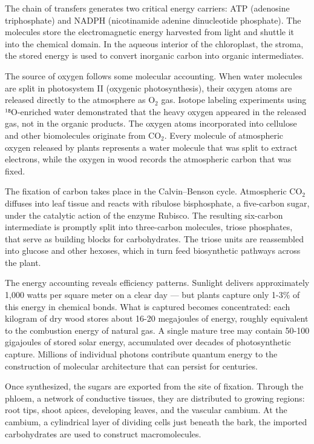 The chain of transfers generates two critical energy carriers: ATP (adenosine triphosphate) and NADPH (nicotinamide adenine dinucleotide phosphate). The molecules store the electromagnetic energy harvested from light and shuttle it into the chemical domain. In the aqueous interior of the chloroplast, the stroma, the stored energy is used to convert inorganic carbon into organic intermediates.

The source of oxygen follows some molecular accounting. When water molecules are split in photosystem II (oxygenic photosynthesis), their oxygen atoms are released directly to the atmosphere as \(\mathrm{O}_2\) gas. Isotope labeling experiments using ¹⁸O-enriched water demonstrated that the heavy oxygen appeared in the released gas, not in the organic products. The oxygen atoms incorporated into cellulose and other biomolecules originate from \(\mathrm{CO}_2\). Every molecule of atmospheric oxygen released by plants represents a water molecule that was split to extract electrons, while the oxygen in wood records the atmospheric carbon that was fixed.

The fixation of carbon takes place in the Calvin–Benson cycle. Atmospheric \(\mathrm{CO}_2\) diffuses into leaf tissue and reacts with ribulose bisphosphate, a five-carbon sugar, under the catalytic action of the enzyme Rubisco. The resulting six-carbon intermediate is promptly split into three-carbon molecules, triose phosphates, that serve as building blocks for carbohydrates. The triose units are reassembled into glucose and other hexoses, which in turn feed biosynthetic pathways across the plant.

The energy accounting reveals efficiency patterns. Sunlight delivers approximately 1,000 watts per square meter on a clear day — but plants capture only 1-3\% of this energy in chemical bonds. What is captured becomes concentrated: each kilogram of dry wood stores about 16-20 megajoules of energy, roughly equivalent to the combustion energy of natural gas. A single mature tree may contain 50-100 gigajoules of stored solar energy, accumulated over decades of photosynthetic capture. Millions of individual photons contribute quantum energy to the construction of molecular architecture that can persist for centuries.

Once synthesized, the sugars are exported from the site of fixation. Through the phloem, a network of conductive tissues, they are distributed to growing regions: root tips, shoot apices, developing leaves, and the vascular cambium. At the cambium, a cylindrical layer of dividing cells just beneath the bark, the imported carbohydrates are used to construct macromolecules.

